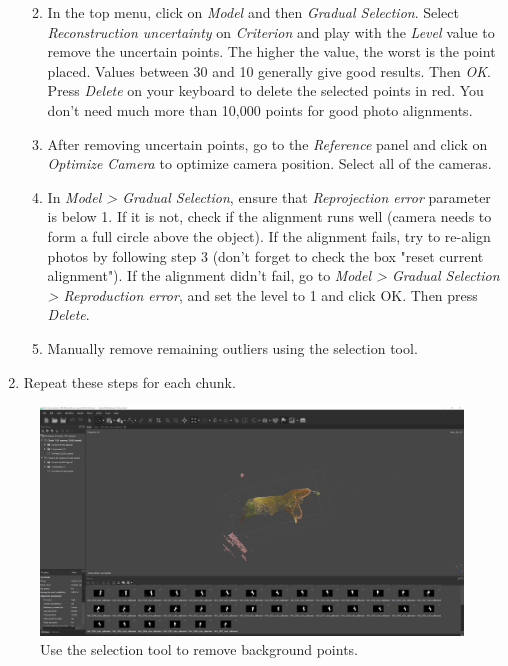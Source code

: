 \documentclass[
]{book}
\begin{document}
\begin{enumerate}
  \begin{enumerate}
  \def\labelenumii{\arabic{enumii}.}
  \item
    In the top menu, click on \emph{Model} and then \emph{Gradual Selection}.
    Select \emph{Reconstruction uncertainty} on \emph{Criterion} and play with
    the \emph{Level} value to remove the uncertain points. The higher the
    value, the worst is the point placed. Values between 30 and 10
    generally give good results. Then \emph{OK}. Press \emph{Delete} on your
    keyboard to delete the selected points in red. You don't need
    much more than 10,000 points for good photo alignments.
  \item
    After removing uncertain points, go to the \emph{Reference} panel and
    click on \emph{Optimize Camera} to optimize camera position. Select
    all of the cameras.
  \item
    In \emph{Model \textgreater{} Gradual Selection}, ensure that \emph{Reprojection
    error} parameter is below 1. If it is not, check if the
    alignment runs well (camera needs to form a full circle above
    the object). If the alignment fails, try to re-align photos by
    following step 3 (don't forget to check the box "reset current
    alignment"). If the alignment didn't fail, go to \emph{Model \textgreater{}
    Gradual Selection \textgreater{} Reproduction error}, and set the level to 1
    and click OK. Then press \emph{Delete}.
  \item
    Manually remove remaining outliers using the selection tool.
  \end{enumerate}
\item
  Repeat these steps for each chunk.
\end{enumerate}

\begin{figure}

{\centering \includegraphics[width=1\linewidth]{Figures/metashape_delete_selectedpoints} 

}

\caption{Use the selection tool to remove background points.}\label{fig:removepoints1}
\end{figure}
\end{document}
